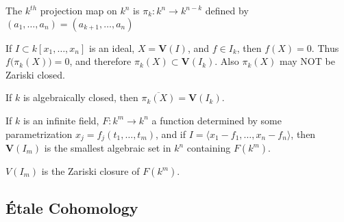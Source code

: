             \begin{definition}
                The $k^{th}$ projection map on $k^{n}$ is
                $\pi_{k}:k^{n}\rightarrow k^{n-k}$ defined by
                $(a_{1},\hdots,a_{n})=(a_{k+1},\hdots,a_{n})$
            \end{definition}
            If $I\subset{k}[x_{1},\hdots,x_{n}]$ is an ideal,
            $X=\mathbf{V}(I)$, and $f\in{I_{k}}$, then $f(X)=0$.
            Thus $f\big(\pi_{k}(X)\big)=0$, and therefore
            $\pi_{k}(X)\subset\mathbf{V}(I_k)$.
            Also $\pi_{k}(X)$ may NOT be Zariski closed.
            \begin{theorem}
                If $k$ is algebraically closed,
                then $\overline{\pi_k(X)}=\mathbf{V}(I_k)$.
            \end{theorem}
            \begin{theorem}
                If $k$ is an infinite field,
                $F:k^{m}\rightarrow{k^{n}}$ a function determined
                by some parametrization
                $x_{j}=f_{j}(t_{1},\hdots,t_{m})$, and if
                $I=\langle{x_{1}-f_{1}},\hdots,x_{n}-f_{n}\rangle$,
                then $\mathbf{V}(I_m)$ is the smallest algebraic
                set in $k^{n}$ containing $F(k^{m})$.
            \end{theorem}
            $V(I_{m})$ is the Zariski closure of $F(k^{m})$.
        \subsection{\'{E}tale Cohomology}
